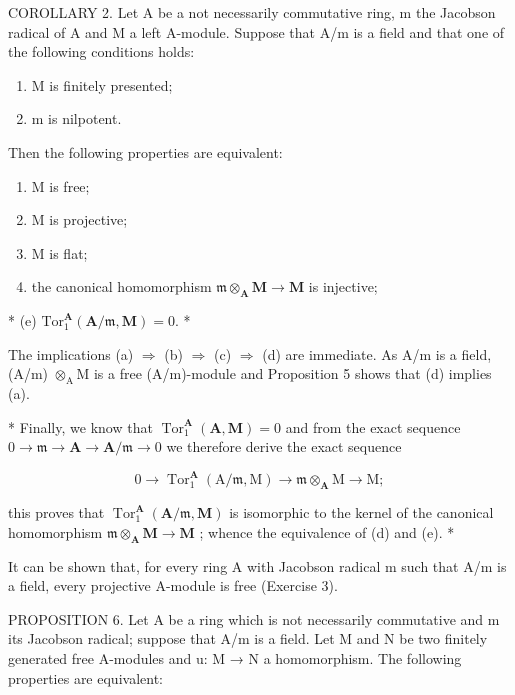 COROLLARY 2. Let A be a not necessarily commutative ring, m the Jacobson radical of A and M a left A-module. Suppose that A/m is a field and that one of the following conditions holds:

\begin{enumerate}
\def\labelenumi{(\roman{enumi})}
\item
  M is finitely presented;
\item
  m is nilpotent.
\end{enumerate}

Then the following properties are equivalent:

\begin{enumerate}
\def\labelenumi{(\alph{enumi})}
\item
  M is free;
\item
  M is projective;
\item
  M is flat;
\item
  the canonical homomorphism \(\mathfrak{m} \otimes_{\mathbf{A}} \mathbf{M} \to \mathbf{M}\) is injective;
\end{enumerate}

* (e) \(\mathrm{Tor}_1^{\mathbf{A}}(\mathbf{A} / \mathfrak{m},\mathbf{M}) = 0.\) *

The implications (a) \(\Rightarrow\) (b) \(\Rightarrow\) (c) \(\Rightarrow\) (d) are immediate. As A/m is a field, (A/m) \(\otimes_{\mathrm{A}} \mathrm{M}\) is a free (A/m)-module and Proposition 5 shows that (d) implies (a).

* Finally, we know that \(\operatorname{Tor}_1^{\mathbf{A}}(\mathbf{A},\mathbf{M}) = 0\) and from the exact sequence \(0\to \mathfrak{m}\to \mathbf{A}\to \mathbf{A} / \mathfrak{m}\to 0\) we therefore derive the exact sequence

\[
0 \rightarrow \operatorname{Tor} _ {1} ^ {\mathbf {A}} (\mathrm{A} / \mathfrak {m}, \mathrm{M}) \rightarrow \mathfrak {m} \otimes_ {\mathbf {A}} \mathrm{M} \rightarrow \mathrm{M};
\]

this proves that \(\operatorname{Tor}_1^{\mathbf{A}}(\mathbf{A} / \mathfrak{m},\mathbf{M})\) is isomorphic to the kernel of the canonical homomorphism \(\mathfrak{m}\otimes_{\mathbf{A}}\mathbf{M}\to \mathbf{M}\) ; whence the equivalence of (d) and (e). *

It can be shown that, for every ring A with Jacobson radical m such that A/m is a field, every projective A-module is free (Exercise 3).

PROPOSITION 6. Let A be a ring which is not necessarily commutative and m its Jacobson radical; suppose that A/m is a field. Let M and N be two finitely generated free A-modules and u: M → N a homomorphism. The following properties are equivalent:

